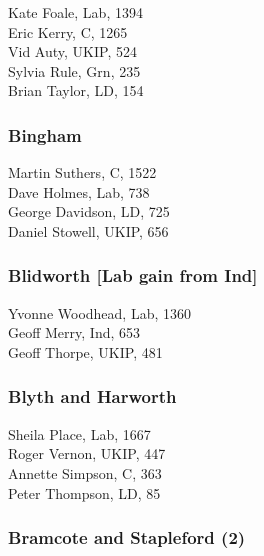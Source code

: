 \documentclass[a4paper,openany,10pt]{book}
\begin{document}
Kate Foale, Lab, 1394\\
Eric Kerry, C, 1265\\
Vid Auty, UKIP, 524\\
Sylvia Rule, Grn, 235\\
Brian Taylor, LD, 154\\


\subsubsection*{Bingham}



Martin Suthers, C, 1522\\
Dave Holmes, Lab, 738\\
George Davidson, LD, 725\\
Daniel Stowell, UKIP, 656\\


\subsubsection*{Blidworth \hspace*{\fill}\nolinebreak[1]%
\enspace\hspace*{\fill}
[Lab gain from Ind]}



Yvonne Woodhead, Lab, 1360\\
Geoff Merry, Ind, 653\\
Geoff Thorpe, UKIP, 481\\


\subsubsection*{Blyth and Harworth}



Sheila Place, Lab, 1667\\
Roger Vernon, UKIP, 447\\
Annette Simpson, C, 363\\
Peter Thompson, LD, 85\\


\subsubsection*{Bramcote and Stapleford (2)}
\end{document}
